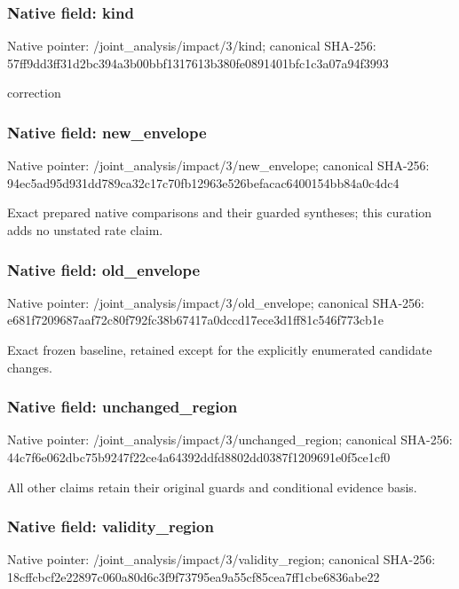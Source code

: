 \documentclass[10pt,a4paper]{article}
\begin{document}
\subsubsection{Native field: kind}
Native pointer: /joint\_\allowbreak{}analysis/impact/3/kind; canonical SHA-256: 57ff9dd3ff31d2bc394a3b00bbf1317613b380fe0891401bfc1c3a07a94f3993

\begingroup\raggedright\sloppy correction\par\endgroup

\subsubsection{Native field: new\_\allowbreak{}envelope}
Native pointer: /joint\_\allowbreak{}analysis/impact/3/new\_\allowbreak{}envelope; canonical SHA-256: 94ec5ad95d931dd789ca32c17c70fb12963e526befacac6400154bb84a0c4dc4

\begingroup\raggedright\sloppy Exact prepared native comparisons and their guarded syntheses;\allowbreak{} this curation adds no unstated rate claim.\par\endgroup

\subsubsection{Native field: old\_\allowbreak{}envelope}
Native pointer: /joint\_\allowbreak{}analysis/impact/3/old\_\allowbreak{}envelope; canonical SHA-256: e681f7209687aaf72c80f792fc38b67417a0dccd17ece3d1ff81c546f773cb1e

\begingroup\raggedright\sloppy Exact frozen baseline,\allowbreak{} retained except for the explicitly enumerated candidate changes.\par\endgroup

\subsubsection{Native field: unchanged\_\allowbreak{}region}
Native pointer: /joint\_\allowbreak{}analysis/impact/3/unchanged\_\allowbreak{}region; canonical SHA-256: 44c7f6e062dbc75b9247f22ce4a64392ddfd8802dd0387f1209691e0f5ce1cf0

\begingroup\raggedright\sloppy All other claims retain their original guards and conditional evidence basis.\par\endgroup

\subsubsection{Native field: validity\_\allowbreak{}region}
Native pointer: /joint\_\allowbreak{}analysis/impact/3/validity\_\allowbreak{}region; canonical SHA-256: 18cffcbcf2e22897c060a80d6c3f9f73795ea9a55cf85cea7ff1cbe6836abe22
\end{document}
